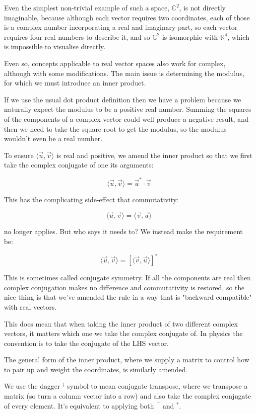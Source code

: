 Even the simplest non-trivial example of such a space, $\mathbb{C}^2$, is not directly imaginable, because although each vector requires two coordinates, each of those is a complex number incorporating a real and imaginary part, so each vector requires four real numbers to describe it, and so $\mathbb{C}^2$ is isomorphic with $\mathbb{R}^4$, which is impossible to visualise directly.

Even so, concepts applicable to real vector spaces also work for complex, although with some modifications. The main issue is determining the modulus, for which we must introduce an inner product.

If we use the usual dot product definition then we have a problem because we naturally expect the modulus to be a positive real number. Summing the squares of the components of a complex vector could well produce a negative result, and then we need to take the square root to get the modulus, so the modulus wouldn't even be a real number.

To ensure $\langle \vec{u}, \vec{v} \rangle$ is real and positive, we amend the inner product so that we first take the complex conjugate of one its arguments:

$$
\langle \vec{u}, \vec{v} \rangle
=
\vec{u}^* \cdot \vec{v}
$$

This has the complicating side-effect that commutativity:

$$
\langle \vec{u}, \vec{v} \rangle
=
\langle \vec{v}, \vec{u} \rangle
$$

no longer applies. But who says it needs to? We instead make the requirement be:

$$
\langle \vec{u}, \vec{v} \rangle
=
\left[ \langle \vec{v}, \vec{u} \rangle \right]^*
$$

This is sometimes called conjugate symmetry. If all the components are real then complex conjugation makes no difference and commutativity is restored, so the nice thing is that we've amended the rule in a way that is "backward compatible" with real vectors.

This does mean that when taking the inner product of two different complex vectors, it matters which one we take the complex conjugate of. In physics the convention is to take the conjugate of the LHS vector.

The general form of the inner product, where we supply a matrix to control how to pair up and weight the coordinates, is similarly amended.

We use the dagger $^\dagger$ symbol to mean conjugate transpose, where we transpose a matrix (so turn a column vector into a row) and also take the complex conjugate of every element. It's equivalent to applying both $^\intercal$ and $^*$.

